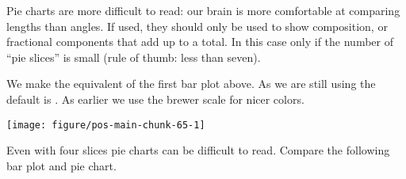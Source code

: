 \documentclass[krantz2]{krantz}\usepackage{knitr}%
\begin{document}
Pie charts are more difficult to read: our brain is more comfortable at comparing
lengths than angles. If used, they should only be used to show composition, or
fractional components that add up to a total. In this case only if the number of
“pie slices” is small (rule of thumb: less than seven).

We make the equivalent of the first bar plot above. As we are still using  the default is . As earlier we use the brewer scale for nicer colors.

\begin{knitrout}\footnotesize
{}\color{fgcolor}\begin{kframe}
\begin{alltt}
\hlstd{(}  \hlstd{(} \hlstd{=} \hlstd{(}\hlstd{),}  \hlstd{=}  \hlopt{+}
  \hlstd{(} \hlstd{=} \hlstd{,}  \hlstd{=} \hlstd{)} \hlopt{+}
  \hlstd{(} \hlstd{=} \hlstd{)} \hlopt{+}
  \hlstd{()} \hlopt{+}
  \hlstd{(} \hlstd{=} \hlstd{)} \hlopt{+}
  \hlstd{(} \hlstd{=} \hlstd{,}  \hlstd{=} \hlstd{)}
\end{alltt}
\end{kframe}

{\centering \texttt{[image: figure/pos-main-chunk-65-1]} 

}



\end{knitrout}

Even with four slices pie charts can be difficult to read. Compare the following bar plot and pie chart.
\end{document}
